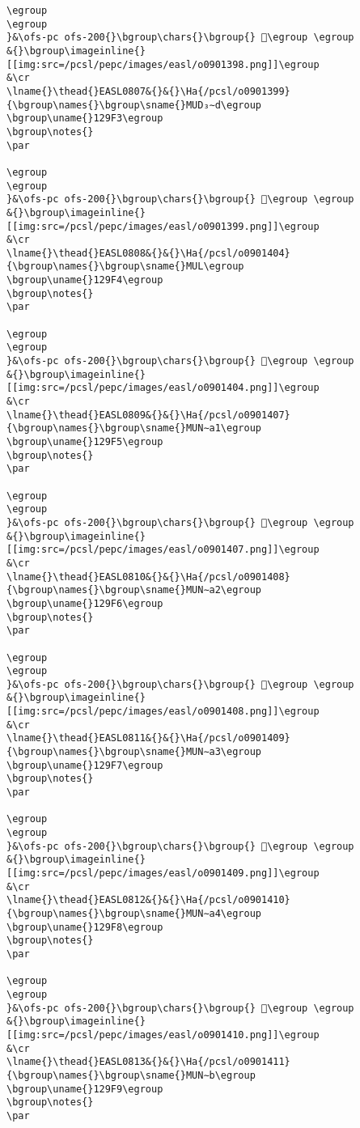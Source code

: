 \begin{verbatim}
\egroup
\egroup
}&\ofs-pc ofs-200{}\bgroup\chars{}\bgroup{} 𒧲\egroup \egroup
&{}\bgroup\imageinline{}[[img:src=/pcsl/pepc/images/easl/o0901398.png]]\egroup
&\cr
\lname{}\thead{}EASL0807&{}&{}\Ha{/pcsl/o0901399}{\bgroup\names{}\bgroup\sname{}MUD₃∼d\egroup
\bgroup\uname{}129F3\egroup
\bgroup\notes{}
\par 

\egroup
\egroup
}&\ofs-pc ofs-200{}\bgroup\chars{}\bgroup{} 𒧳\egroup \egroup
&{}\bgroup\imageinline{}[[img:src=/pcsl/pepc/images/easl/o0901399.png]]\egroup
&\cr
\lname{}\thead{}EASL0808&{}&{}\Ha{/pcsl/o0901404}{\bgroup\names{}\bgroup\sname{}MUL\egroup
\bgroup\uname{}129F4\egroup
\bgroup\notes{}
\par 

\egroup
\egroup
}&\ofs-pc ofs-200{}\bgroup\chars{}\bgroup{} 𒧴\egroup \egroup
&{}\bgroup\imageinline{}[[img:src=/pcsl/pepc/images/easl/o0901404.png]]\egroup
&\cr
\lname{}\thead{}EASL0809&{}&{}\Ha{/pcsl/o0901407}{\bgroup\names{}\bgroup\sname{}MUN∼a1\egroup
\bgroup\uname{}129F5\egroup
\bgroup\notes{}
\par 

\egroup
\egroup
}&\ofs-pc ofs-200{}\bgroup\chars{}\bgroup{} 𒧵\egroup \egroup
&{}\bgroup\imageinline{}[[img:src=/pcsl/pepc/images/easl/o0901407.png]]\egroup
&\cr
\lname{}\thead{}EASL0810&{}&{}\Ha{/pcsl/o0901408}{\bgroup\names{}\bgroup\sname{}MUN∼a2\egroup
\bgroup\uname{}129F6\egroup
\bgroup\notes{}
\par 

\egroup
\egroup
}&\ofs-pc ofs-200{}\bgroup\chars{}\bgroup{} 𒧶\egroup \egroup
&{}\bgroup\imageinline{}[[img:src=/pcsl/pepc/images/easl/o0901408.png]]\egroup
&\cr
\lname{}\thead{}EASL0811&{}&{}\Ha{/pcsl/o0901409}{\bgroup\names{}\bgroup\sname{}MUN∼a3\egroup
\bgroup\uname{}129F7\egroup
\bgroup\notes{}
\par 

\egroup
\egroup
}&\ofs-pc ofs-200{}\bgroup\chars{}\bgroup{} 𒧷\egroup \egroup
&{}\bgroup\imageinline{}[[img:src=/pcsl/pepc/images/easl/o0901409.png]]\egroup
&\cr
\lname{}\thead{}EASL0812&{}&{}\Ha{/pcsl/o0901410}{\bgroup\names{}\bgroup\sname{}MUN∼a4\egroup
\bgroup\uname{}129F8\egroup
\bgroup\notes{}
\par 

\egroup
\egroup
}&\ofs-pc ofs-200{}\bgroup\chars{}\bgroup{} 𒧸\egroup \egroup
&{}\bgroup\imageinline{}[[img:src=/pcsl/pepc/images/easl/o0901410.png]]\egroup
&\cr
\lname{}\thead{}EASL0813&{}&{}\Ha{/pcsl/o0901411}{\bgroup\names{}\bgroup\sname{}MUN∼b\egroup
\bgroup\uname{}129F9\egroup
\bgroup\notes{}
\par 


\end{verbatim}
